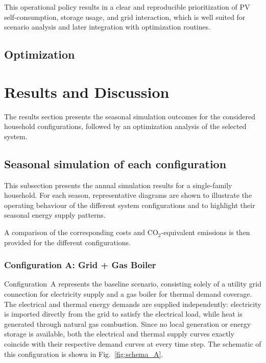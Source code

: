 \documentclass[12pt,a4paper]{report}
\begin{document}
This operational policy results in a clear and reproducible prioritization of PV self-consumption, storage usage, and grid interaction, which is well suited for scenario analysis and later integration with optimization routines.

\section{Optimization}



\chapter{Results and Discussion}
The results section presents the seasonal simulation outcomes for the considered household configurations, followed by an optimization analysis of the selected system.

\section{Seasonal simulation of each configuration}
\label{sec:results_config}

This subsection presents the annual simulation results for a single-family household. For each season, representative diagrams are shown to illustrate the operating behaviour of the different system configurations and to highlight their seasonal energy supply patterns.

A comparison of the corresponding costs and \(\mathrm{CO_2}\)-equivalent emissions is then provided for the different configurations.


\newpage
\subsection*{Configuration A: Grid + Gas Boiler}
Configuration~A represents the baseline scenario, consisting solely of a
utility grid connection for electricity supply and a gas boiler for thermal
demand coverage. The electrical and thermal energy demands are supplied
independently: electricity is imported directly from the grid to satisfy the
electrical load, while heat is generated through natural gas combustion.
Since no local generation or energy storage is available, both the electrical
and thermal supply curves exactly coincide with their respective demand curves
at every time step. The schematic of this configuration is shown in
Fig.~\ref{fig:schema_A}.
\end{document}
